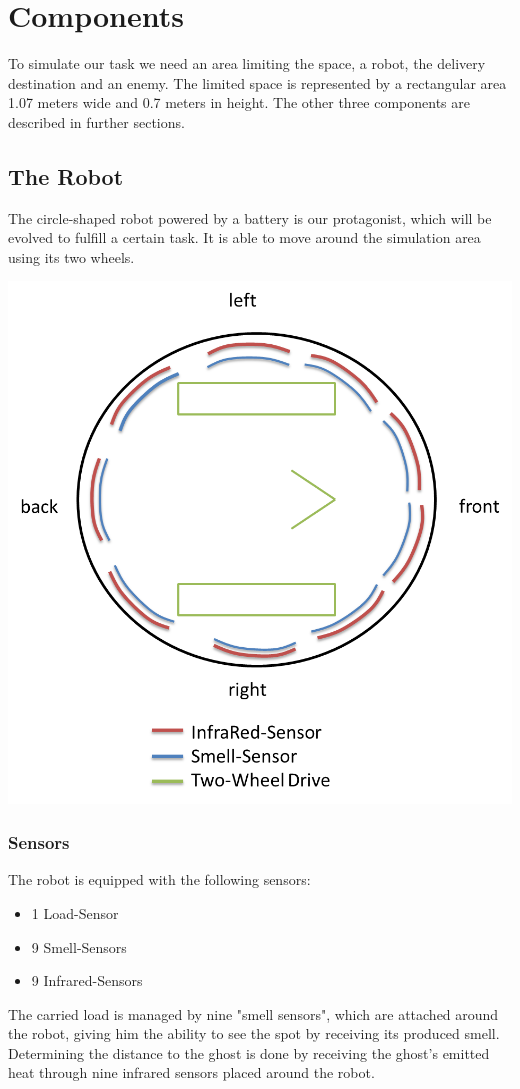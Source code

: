 \documentclass[12pt,fleqn,a4paper]{article}
\begin{document}
\section{Components}
To simulate our task we need an area limiting the space, a robot, the delivery destination and an enemy. The limited space is represented by a rectangular area 1.07 meters wide and 0.7 meters in height. The other three components are described in further sections.

\subsection{The Robot}
The circle-shaped robot powered by a battery is our protagonist, which will be evolved to fulfill a certain task. It is able to move around the simulation area using its two wheels. 

\begin{center}
\includegraphics[scale=0.333]{img/robot.png}
\end{center}


\subsubsection{Sensors}
The robot is equipped with the following sensors:
\begin{itemize}
    \item 1 Load-Sensor
    \item 9 Smell-Sensors
    \item 9 Infrared-Sensors
\end{itemize}
The carried load is managed by nine "smell sensors", which are attached around the robot, giving him the ability to see the spot by receiving its produced smell. Determining the distance to the ghost is done by receiving the ghost's emitted heat through nine infrared sensors placed around the robot.
\end{document}
